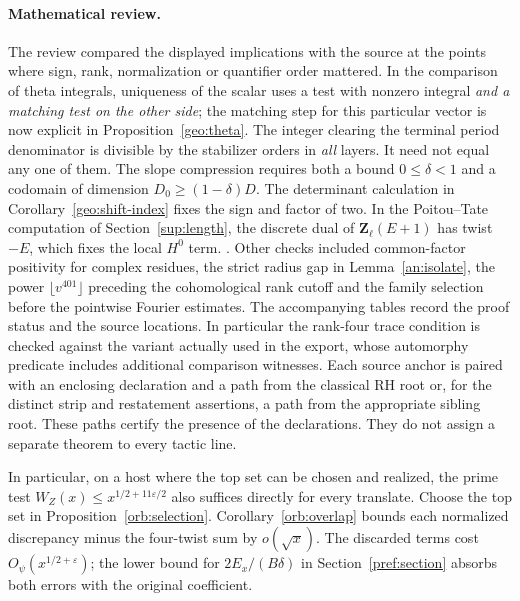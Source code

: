 \paragraph{Mathematical review.}
The review compared the displayed implications with the source at the points where sign, rank, normalization or quantifier order mattered. In the comparison of theta integrals, uniqueness of the scalar uses a test with nonzero integral \emph{and a matching test on the other side}; the matching step for this particular vector is now explicit in Proposition~\ref{geo:theta}. The integer clearing the terminal period denominator is divisible by the stabilizer orders in \emph{all} layers. It need not equal any one of them. The slope compression requires both a bound \(0\le\delta<1\) and a codomain of dimension \(D_0\ge(1-\delta)D\). The determinant calculation in Corollary~\ref{geo:shift-index} fixes the sign and factor of two. In the Poitou--Tate computation of Section~\ref{sup:length}, the discrete dual of \(\mathbf Z_\ell(E+1)\) has twist \(-E\), which fixes the local \(H^0\) term. . Other checks included common-factor positivity for complex residues, the strict radius gap in Lemma~\ref{an:isolate}, the power \(\lfloor v^{401}\rfloor\) preceding the cohomological rank cutoff and the family selection before the pointwise Fourier estimates. The accompanying tables record the proof status and the source locations. In particular the rank-four trace condition is checked against the variant actually used in the export, whose automorphy predicate includes additional comparison witnesses. Each source anchor is paired with an enclosing declaration and a path from the classical RH root or, for the distinct strip and restatement assertions, a path from the appropriate sibling root. These paths certify the presence of the declarations. They do not assign a separate theorem to every tactic line.





In particular, on a host where the top set can be chosen and realized,
the prime test \(W_Z(x)\le x^{1/2+11\varepsilon/2}\)
also suffices directly for every translate. Choose the top set in
Proposition~\ref{orb:selection}. Corollary~\ref{orb:overlap} bounds
each normalized discrepancy minus the four-twist sum by \(o(\sqrt x)\).
The discarded terms cost \(O_\psi(x^{1/2+\varepsilon})\);
the lower bound for \(2E_x/(B\delta)\) in Section~\ref{pref:section}
absorbs both errors with the original coefficient.

